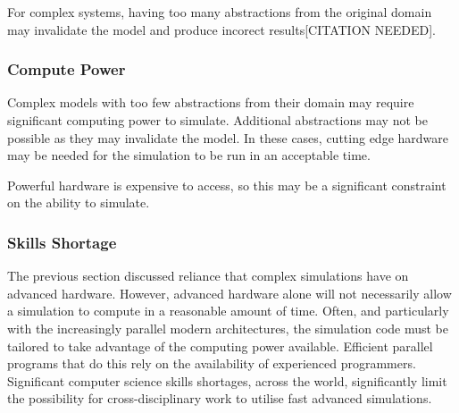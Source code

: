 \documentclass{UoYCSproject}
\begin{document}
For complex systems, having too many abstractions from the original domain may invalidate the model and produce incorect results[CITATION NEEDED].

\subsubsection{Compute Power}
Complex models with too few abstractions from their domain may require significant computing power to simulate. Additional abstractions may not be possible as they may invalidate the model. In these cases, cutting edge hardware may be needed for the simulation to be run in an acceptable time. 


Powerful hardware is expensive to access, so this may be a significant constraint on the ability to simulate.





\subsubsection{Skills Shortage}
\label{skills_shortage}
The previous section discussed reliance that complex simulations have on advanced hardware. However, advanced hardware alone will not necessarily allow a simulation to compute in a reasonable amount of time. Often, and particularly with the increasingly parallel modern architectures, the simulation code must be tailored to take advantage of the computing power available. Efficient parallel programs that do this rely on the availability of experienced programmers. Significant computer science skills shortages, across the world, significantly limit the possibility for cross-disciplinary work to utilise fast advanced simulations.

\end{document}
